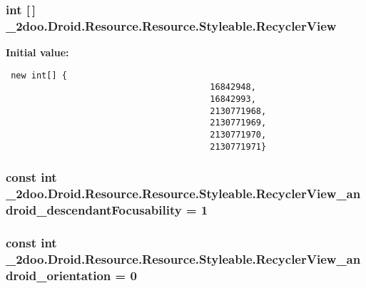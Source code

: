 \hypertarget{class__2doo_1_1_droid_1_1_resource_1_1_styleable_7d5ca3ee42fa80322fad607f7e33e8e5}{
\subsubsection[{RecyclerView}]{\setlength{\rightskip}{0pt plus 5cm}int \mbox{[}$\,$\mbox{]} \_\-2doo.Droid.Resource.Resource.Styleable.RecyclerView}}
\label{class__2doo_1_1_droid_1_1_resource_1_1_styleable_7d5ca3ee42fa80322fad607f7e33e8e5}


\textbf{Initial value:}

\begin{Code}\begin{verbatim} new int[] {
                                        16842948,
                                        16842993,
                                        2130771968,
                                        2130771969,
                                        2130771970,
                                        2130771971}
\end{verbatim}
\end{Code}
\hypertarget{class__2doo_1_1_droid_1_1_resource_1_1_styleable_752b0579cbcb848d6a48d557d83f20a4}{
\subsubsection[{RecyclerView\_\-android\_\-descendantFocusability}]{\setlength{\rightskip}{0pt plus 5cm}const int \_\-2doo.Droid.Resource.Resource.Styleable.RecyclerView\_\-android\_\-descendantFocusability = 1}}
\label{class__2doo_1_1_droid_1_1_resource_1_1_styleable_752b0579cbcb848d6a48d557d83f20a4}


\hypertarget{class__2doo_1_1_droid_1_1_resource_1_1_styleable_fb3104529f4ac028e3d71464ebfe1adb}{
\subsubsection[{RecyclerView\_\-android\_\-orientation}]{\setlength{\rightskip}{0pt plus 5cm}const int \_\-2doo.Droid.Resource.Resource.Styleable.RecyclerView\_\-android\_\-orientation = 0}}
\label{class__2doo_1_1_droid_1_1_resource_1_1_styleable_fb3104529f4ac028e3d71464ebfe1adb}


